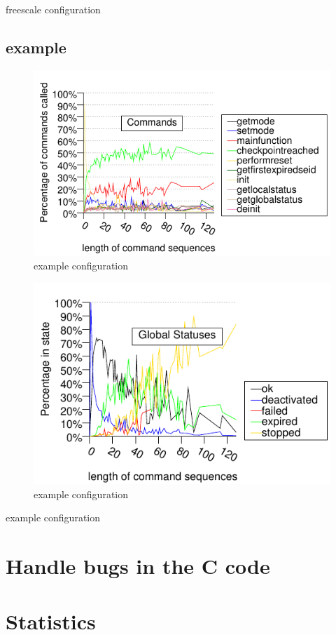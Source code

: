 \begin{table}[!h]
\label{TABLE:STATUSES_FREESCALE}

\caption{freescale configuration}
\end{table}

\subsection{example}

\begin{figure}[h!]
\label{FIG:COMMANDS_EXAMPLE}
\caption{example configuration}
\begin{center}
\includegraphics{generated_pictures/history_commands_example.pdf}
\end{center}
\end{figure}

\begin{figure}[h!]
\label{FIG:STATUSES_EXAMPLE}
\caption{example configuration}
\begin{center}
\includegraphics{generated_pictures/history_statuses_example.pdf}
\end{center}
\end{figure}

\begin{table}[!h]
\label{TABLE:STATUSES_EXAMPLE}

\caption{example configuration}
\end{table}

\section{Handle bugs in the C code}
\label{sec:handlebugs}

\section{Statistics}
